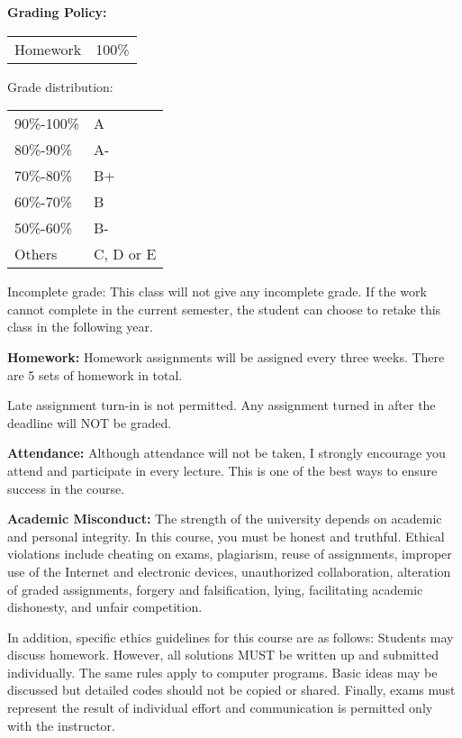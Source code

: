 \documentclass[a4paper,10pt]{article}
\begin{document}
\textbf{Grading Policy:}

\begin{tabular}{lr}
Homework & 100\%\\
\end{tabular}

Grade distribution:
\begin{tabular}{ll}
90\%-100\%   & A \\
80\%-90\%  & A- \\
70\%-80\%  & B+ \\
60\%-70\%  & B \\
50\%-60\%  & B- \\
Others         & C, D or E

\end{tabular}


Incomplete grade: This class will not give any
incomplete grade. If the work cannot complete in the
current semester, the student can choose to retake this
class in the following year.






\textbf{Homework:} Homework assignments will be assigned every three weeks. There are 5 sets of homework in total. 

Late assignment turn-in is not permitted. Any assignment turned in after the deadline will NOT be graded.




\textbf{Attendance:} Although attendance will not be taken, I strongly encourage you attend and participate in every lecture. This is one of the best ways to ensure success in the course.






\textbf{Academic Misconduct:} The strength of the university depends on academic and personal integrity. In this course, you must be honest 
and truthful. Ethical violations include cheating on exams, plagiarism, reuse of assignments, improper use 
of the Internet and electronic devices, unauthorized collaboration, alteration of graded assignments, forgery 
and falsification, lying, facilitating academic dishonesty, and unfair competition.

In addition, specific ethics guidelines for this course are as follows: Students may discuss homework. However, 
all solutions MUST be written up and submitted individually. The same rules apply to computer programs. 
Basic ideas may be discussed but detailed codes should not be copied or shared. Finally, exams must 
represent the result of individual effort and communication is permitted only with the instructor.
\end{document}
